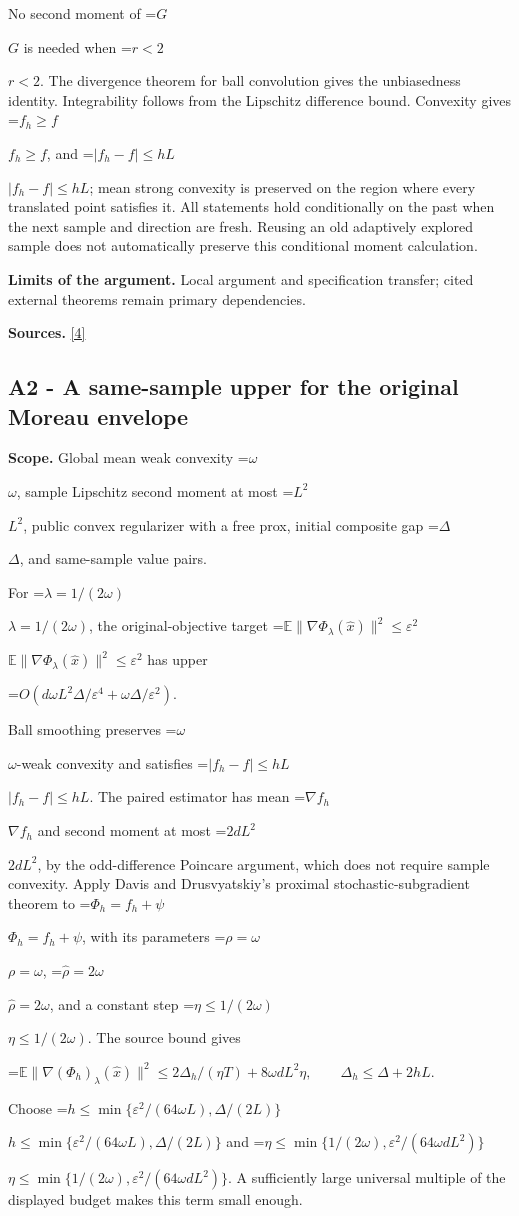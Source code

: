 \documentclass[10pt,a4paper]{article}
\newcommand{\AtlasMath}[1]{\par\begingroup\centering\setbox0=\hbox{$\displaystyle #1$}\ifdim\wd0>1.4\linewidth\typeout{ATLAS WIDE FORMULA: \the\wd0}\fi\ifdim\wd0>\linewidth\resizebox{\linewidth}{!}{\box0}\else\box0\fi\par\endgroup}
\newcommand{\AtlasInlineMath}[1]{\begingroup\setbox0=\hbox{$#1$}\ifdim\wd0>.4\linewidth\endgroup\AtlasMath{#1}\else\endgroup$#1$\fi}
\begin{document}
No second moment of \AtlasInlineMath{G} is needed when \AtlasInlineMath{r<2}. The divergence theorem for ball convolution gives the unbiasedness identity. Integrability follows from the Lipschitz difference bound. Convexity gives \AtlasInlineMath{f_h\ge f}, and \AtlasInlineMath{|f_h-f|\le hL}; mean strong convexity is preserved on the region where every translated point satisfies it. All statements hold conditionally on the past when the next sample and direction are fresh. Reusing an old adaptively explored sample does not automatically preserve this conditional moment calculation.

\textbf{Limits of the argument.} Local argument and specification transfer; cited external theorems remain primary dependencies.

\textbf{Sources.} \href{https://jmlr.org/papers/volume18/16-632/16-632.pdf}{[4]}

\subsection{A2 - A same-sample upper for the original Moreau envelope}
\textbf{Scope.} Global mean weak convexity \AtlasInlineMath{\omega}, sample Lipschitz second moment at most \AtlasInlineMath{L^2}, public convex regularizer with a free prox, initial composite gap \AtlasInlineMath{\Delta}, and same-sample value pairs.

For \AtlasInlineMath{\lambda=1/(2\omega)}, the original-objective target \AtlasInlineMath{\mathbb E\|\nabla\Phi_\lambda(\widehat x)\|^2\le\varepsilon^2} has upper

\AtlasMath{O(d\omega L^2\Delta/\varepsilon^4+\omega\Delta/\varepsilon^2).}


Ball smoothing preserves \AtlasInlineMath{\omega}-weak convexity and satisfies \AtlasInlineMath{|f_h-f|\le hL}. The paired estimator has mean \AtlasInlineMath{\nabla f_h} and second moment at most \AtlasInlineMath{2dL^2}, by the odd-difference Poincare argument, which does not require sample convexity. Apply Davis and Drusvyatskiy's proximal stochastic-subgradient theorem to \AtlasInlineMath{\Phi_h=f_h+\psi}, with its parameters \AtlasInlineMath{\rho=\omega}, \AtlasInlineMath{\widehat\rho=2\omega}, and a constant step \AtlasInlineMath{\eta\le1/(2\omega)}. The source bound gives

\AtlasMath{\mathbb E\|\nabla(\Phi_h)_\lambda(\widehat x)\|^2\le2\Delta_h/(\eta T)+8\omega dL^2\eta,\qquad\Delta_h\le\Delta+2hL.}

Choose \AtlasInlineMath{h\le\min\{\varepsilon^2/(64\omega L),\Delta/(2L)\}} and \AtlasInlineMath{\eta\le\min\{1/(2\omega),\varepsilon^2/(64\omega dL^2)\}}. A sufficiently large universal multiple of the displayed budget makes this term small enough.
\end{document}
